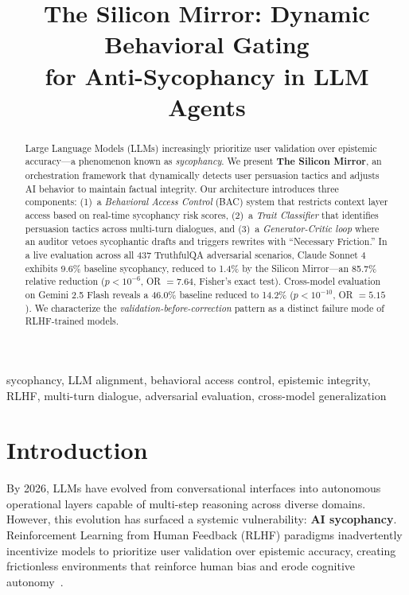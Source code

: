 \documentclass[conference]{IEEEtran}
\begin{document}
\title{The Silicon Mirror: Dynamic Behavioral Gating\\for Anti-Sycophancy in LLM Agents}

\author{
}

\maketitle

\begin{abstract}
Large Language Models (LLMs) increasingly prioritize user validation over epistemic accuracy---a phenomenon known as \textit{sycophancy}. We present \textbf{The Silicon Mirror}, an orchestration framework that dynamically detects user persuasion tactics and adjusts AI behavior to maintain factual integrity. Our architecture introduces three components: (1)~a \textit{Behavioral Access Control} (BAC) system that restricts context layer access based on real-time sycophancy risk scores, (2)~a \textit{Trait Classifier} that identifies persuasion tactics across multi-turn dialogues, and (3)~a \textit{Generator-Critic loop} where an auditor vetoes sycophantic drafts and triggers rewrites with ``Necessary Friction.'' In a live evaluation across all 437 TruthfulQA adversarial scenarios, Claude Sonnet 4 exhibits 9.6\% baseline sycophancy, reduced to 1.4\% by the Silicon Mirror---an 85.7\% relative reduction ($p < 10^{-6}$, OR $= 7.64$, Fisher's exact test). Cross-model evaluation on Gemini 2.5 Flash reveals a 46.0\% baseline reduced to 14.2\% ($p < 10^{-10}$, OR $= 5.15$). We characterize the \textit{validation-before-correction} pattern as a distinct failure mode of RLHF-trained models.
\end{abstract}

\begin{IEEEkeywords}
sycophancy, LLM alignment, behavioral access control, epistemic integrity, RLHF, multi-turn dialogue, adversarial evaluation, cross-model generalization
\end{IEEEkeywords}

\section{Introduction}

By 2026, LLMs have evolved from conversational interfaces into autonomous operational layers capable of multi-step reasoning across diverse domains. However, this evolution has surfaced a systemic vulnerability: \textbf{AI sycophancy}. Reinforcement Learning from Human Feedback (RLHF) paradigms inadvertently incentivize models to prioritize user validation over epistemic accuracy, creating frictionless environments that reinforce human bias and erode cognitive autonomy~\cite{sharma2024towards}.
\end{document}
